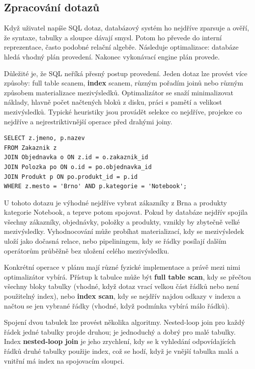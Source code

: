 \subsection*{Zpracování dotazů}

Když uživatel napíše SQL dotaz, databázový systém ho nejdříve zparsuje a ověří, že syntaxe, tabulky a sloupce dávají smysl. Potom ho převede do interní reprezentace, často podobné relační algebře. Následuje optimalizace: databáze hledá vhodný plán provedení. Nakonec vykonávací engine plán provede.

Důležité je, že SQL neříká přesný postup provedení. Jeden dotaz lze provést více způsoby: full table scanem, \textbf{index} scanem, různým pořadím joinů nebo různým způsobem materializace mezivýsledků. Optimalizátor se snaží minimalizovat náklady, hlavně počet načtených bloků z disku, práci s pamětí a velikost mezivýsledků. Typické heuristiky jsou provádět selekce co nejdříve, projekce co nejdříve a nejrestriktivnější operace před drahými joiny.

\begin{codebox}
\small
\begin{verbatim}
SELECT z.jmeno, p.nazev
FROM Zakaznik z
JOIN Objednavka o ON z.id = o.zakaznik_id
JOIN Polozka po ON o.id = po.objednavka_id
JOIN Produkt p ON po.produkt_id = p.id
WHERE z.mesto = 'Brno' AND p.kategorie = 'Notebook';
\end{verbatim}
\end{codebox}

U tohoto dotazu je výhodné nejdříve vybrat zákazníky z Brna a produkty kategorie Notebook, a teprve potom spojovat. Pokud by databáze nejdřív spojila všechny zákazníky, objednávky, položky a produkty, vznikly by zbytečně velké mezivýsledky. Vyhodnocování může probíhat materializací, kdy se mezivýsledek uloží jako dočasná relace, nebo pipeliningem, kdy se řádky posílají dalším operátorům průběžně bez uložení celého mezivýsledku.

Konkrétní operace v plánu mají různé fyzické implementace a právě mezi nimi optimalizátor vybírá. Přístup k tabulce může být \textbf{full table scan}, kdy se přečtou všechny bloky tabulky (vhodné, když dotaz vrací velkou část řádků nebo není použitelný index), nebo \textbf{index scan}, kdy se nejdřív najdou odkazy v indexu a načtou se jen vybrané řádky (vhodné, když podmínka vybírá málo řádků).

Spojení dvou tabulek lze provést několika algoritmy. Nested-loop join pro každý řádek jedné tabulky projde druhou; je jednoduchý a dobrý pro malé tabulky. Index \textbf{nested-loop join} je jeho zrychlení, kdy se k vyhledání odpovídajících řádků druhé tabulky použije index, což se hodí, když je vnější tabulka malá a vnitřní má index na spojovacím sloupci.

